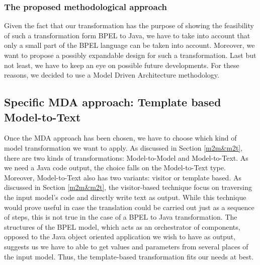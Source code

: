 \subsubsection{The proposed methodological approach}
Given the fact that our transformation has the purpose of showing the feasibility of such a transformation form BPEL to Java, we have to take into account that only a small part of the BPEL language can be taken into account. Moreover, we want to propose a possibly expandable design for such a transformation. Last but not least, we have to keep an eye on possible future developments. For these reasons, we decided to use a Model Driven Architecture methodology.

\subsection{Specific MDA approach: Template based Model-to-Text}
\label{sec:M2TApproach}
Once the MDA approach has been chosen, we have to choose which kind of model transformation we want to apply. As discussed in Section \ref{m2m&m2t}, there are two kinds of transformations: Model-to-Model and Model-to-Text. As we need a Java code output, the choice falls on the Model-to-Text type.
Moreover, Model-to-Text also has two variants: visitor or template based. As discussed in Section \ref{m2m&m2t}, the visitor-based technique focus on traversing the input model's code and directly write text as output. While this technique would prove useful in case the translation could be carried out just as a sequence of steps, this is not true in the case of a BPEL to Java transformation. The structures of the BPEL model, which acts as an orchestrator of components, opposed to the Java object oriented application we wish to have as output, suggests us we have to able to get values and parameters from several places of the input model. Thus, the template-based transformation fits our needs at best.

